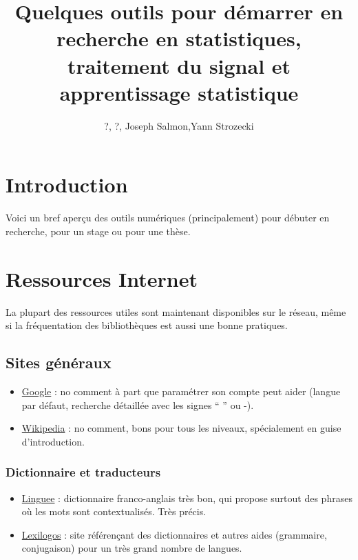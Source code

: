 \documentclass[a4paper,10pt]{article}
\title{Quelques outils pour démarrer en recherche en statistiques, traitement du signal
et apprentissage statistique}
\author{?, ?, Joseph Salmon,Yann Strozecki}
\date {}
\begin{document}
\sloppy
\maketitle
\tableofcontents 


\newpage
\printnomenclature

\section{Introduction}

Voici un bref aperçu des outils numériques (principalement) pour débuter 
en recherche, pour un stage ou pour une thèse.



\section{Ressources Internet}


La plupart des ressources utiles sont maintenant disponibles sur le réseau,
même si la fréquentation des bibliothèques est aussi une bonne pratiques.


\subsection{Sites généraux}
\begin{itemize}
 \item \href{www.google.com}{Google} : 
no comment à part que paramétrer son compte
peut aider (langue par défaut, recherche détaillée avec les signes `` '' ou -).

\item \href{http://wikipedia.org/}{Wikipedia} : no comment, 
bons pour tous les niveaux, spécialement en guise d'introduction.

\end{itemize}




\subsubsection{Dictionnaire et traducteurs}

\begin{itemize}
\item \href{http://www.linguee.com/}{Linguee} : dictionnaire franco-anglais très bon, qui propose 
surtout des phrases où les mots sont contextualisés. Très précis.
\item \href{http://www.lexilogos.com/}{Lexilogos} : site référençant des dictionnaires et autres
aides (grammaire, conjugaison) pour un très grand nombre de langues. 
\end{itemize}
\end{document}

